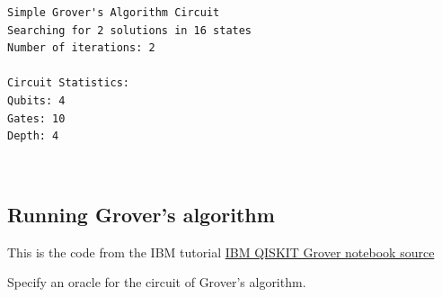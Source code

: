     \begin{Verbatim}[commandchars=\\\{\}]
Simple Grover's Algorithm Circuit
Searching for 2 solutions in 16 states
Number of iterations: 2

Circuit Statistics:
Qubits: 4
Gates: 10
Depth: 4
    \end{Verbatim}
 
            
    
    \begin{center}
    \end{center}
    { \hspace*{\fill} \\}
    

    \hypertarget{running-grovers-algorithm}{%
\subsection*{Running Grover's
algorithm}\label{running-grovers-algorithm}}

This is the code from the IBM tutorial
\href{https://qiskit-community.github.io/qiskit-algorithms/tutorials/06_grover.html}{IBM
QISKIT Grover notebook source}

Specify an oracle for the circuit of Grover's algorithm.


